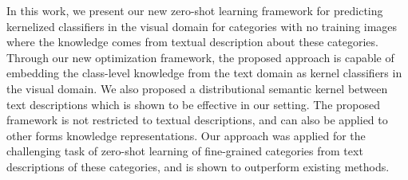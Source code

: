 In this work, we present our new  zero-shot learning framework for predicting kernelized classifiers in the visual domain for categories with no training images where the knowledge comes from textual description about these categories.  Through our new optimization framework, the proposed approach is capable of embedding the class-level knowledge from the text domain as kernel classifiers in the visual domain.  We also proposed a distributional semantic kernel between text descriptions which is shown to be effective in our setting. The proposed framework is not restricted to textual descriptions, and can also be applied to other forms knowledge representations. Our approach was applied for the challenging task of zero-shot learning of fine-grained categories from text descriptions of these categories, and is shown to outperform existing methods.
